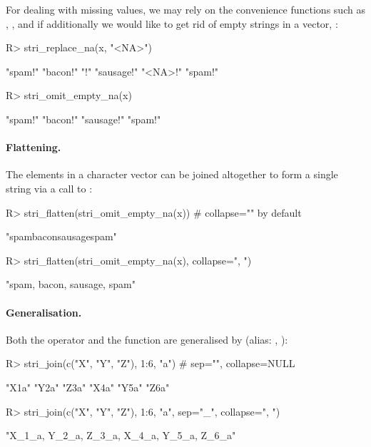 \documentclass[nojss]{jss}\usepackage[]{graphicx}\usepackage[]{color}
\begin{document}
\noindent
For dealing with missing values, we may rely on the
convenience functions such as
, ,
and
 if additionally we would like to get rid
of empty strings in a vector,
:


\begin{Schunk}
\begin{Sinput}
R> stri_replace_na(x, "<NA>") %s+% "!"
\end{Sinput}
\begin{Soutput}
[1] "spam!"    "bacon!"   "!"        "sausage!" "<NA>!"    "spam!"
\end{Soutput}
\begin{Sinput}
R> stri_omit_empty_na(x) %s+% "!"
\end{Sinput}
\begin{Soutput}
[1] "spam!"    "bacon!"   "sausage!" "spam!"
\end{Soutput}
\end{Schunk}


\paragraph{Flattening.}
The elements in a character vector can be joined altogether to
form a single string via a call to  :

\begin{Schunk}
\begin{Sinput}
R> stri_flatten(stri_omit_empty_na(x))  # collapse="" by default
\end{Sinput}
\begin{Soutput}
[1] "spambaconsausagespam"
\end{Soutput}
\begin{Sinput}
R> stri_flatten(stri_omit_empty_na(x), collapse=", ")
\end{Sinput}
\begin{Soutput}
[1] "spam, bacon, sausage, spam"
\end{Soutput}
\end{Schunk}


\paragraph{Generalisation.}
Both the  operator and the  function
are generalised by
 (alias: , ):

\begin{Schunk}
\begin{Sinput}
R> stri_join(c("X", "Y", "Z"), 1:6, "a")  # sep="", collapse=NULL
\end{Sinput}
\begin{Soutput}
[1] "X1a" "Y2a" "Z3a" "X4a" "Y5a" "Z6a"
\end{Soutput}
\begin{Sinput}
R> stri_join(c("X", "Y", "Z"), 1:6, "a", sep="_", collapse=", ")
\end{Sinput}
\begin{Soutput}
[1] "X_1_a, Y_2_a, Z_3_a, X_4_a, Y_5_a, Z_6_a"
\end{Soutput}
\end{Schunk}
\end{document}

